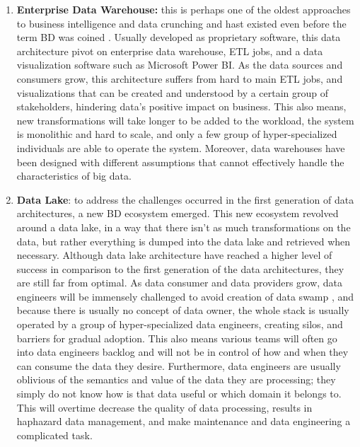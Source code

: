 \documentclass[review]{elsarticle}
\begin{document}
\begin{enumerate}
    \item \textbf{Enterprise Data Warehouse:} this is perhaps one of the oldest approaches to business intelligence and data crunching and hast existed even before the term BD was coined \cite{leonard2011design}. Usually developed as proprietary software, this data architecture pivot on enterprise data warehouse, ETL jobs, and a data visualization software such as Microsoft Power BI. As the data sources and consumers grow, this architecture suffers from hard to main ETL jobs, and visualizations that can be created and understood by a certain group of stakeholders, hindering data's positive impact on business. This also means, new transformations will take longer to be added to the workload, the system is monolithic and hard to scale, and only a few group of hyper-specialized individuals are able to operate the system. Moreover, data warehouses have been designed with different assumptions that cannot effectively handle the characteristics of big data.
    \item \textbf{Data Lake}: to address the challenges occurred in the first generation of data architectures, a new BD ecosystem emerged. This new ecosystem revolved around a data lake, in a way that there isn't as much transformations on the data, but rather everything is dumped into the data lake and retrieved when necessary. Although data lake architecture have reached a higher level of success in comparison to the first generation of the data architectures, they are still far from optimal. As data consumer and data providers grow, data engineers will be immensely challenged to avoid creation of data swamp \cite{brackenbury2018draining}, and because there is usually no concept of data owner, the whole stack is usually operated by a group of hyper-specialized data engineers, creating silos, and barriers for gradual adoption. This also means various teams will often go into data engineers backlog and will not be in control of how and when they can consume the data they desire. Furthermore, data engineers are usually oblivious of the semantics and value of the data they are processing; they simply do not know how is that data useful or which domain it belongs to. This will overtime decrease the quality of data processing, results in haphazard data management, and make maintenance and data engineering a complicated task. 

\end{enumerate}
\end{document}
